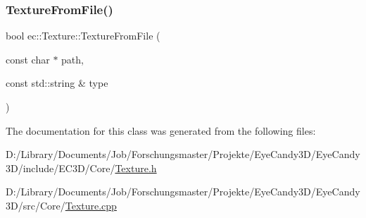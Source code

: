 \subsubsection{\texorpdfstring{Texture\+From\+File()}{TextureFromFile()}}
{\footnotesize\ttfamily bool ec\+::\+Texture\+::\+Texture\+From\+File (\begin{DoxyParamCaption}\item[{const char $\ast$}]{path,  }\item[{const std\+::string \&}]{type }\end{DoxyParamCaption})}



The documentation for this class was generated from the following files\+:\begin{DoxyCompactItemize}
\item 
D\+:/\+Library/\+Documents/\+Job/\+Forschungsmaster/\+Projekte/\+Eye\+Candy3\+D/\+Eye\+Candy3\+D/include/\+E\+C3\+D/\+Core/\mbox{\hyperlink{_texture_8h}{Texture.\+h}}\item 
D\+:/\+Library/\+Documents/\+Job/\+Forschungsmaster/\+Projekte/\+Eye\+Candy3\+D/\+Eye\+Candy3\+D/src/\+Core/\mbox{\hyperlink{_texture_8cpp}{Texture.\+cpp}}\end{DoxyCompactItemize}
